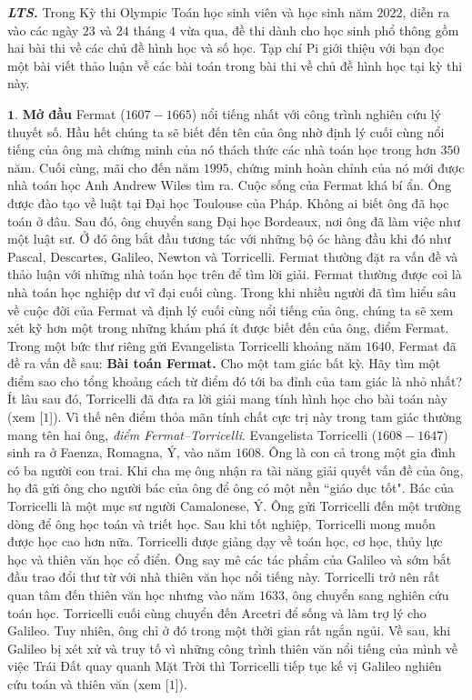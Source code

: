 	\textbf{\color{cackithi}\emph{LTS.}} Trong Kỳ thi Olympic Toán học sinh viên và học sinh năm $2022$, diễn ra vào các ngày $23$ và $24$ tháng $4$ vừa qua, đề thi dành cho học sinh phổ thông gồm hai bài thi về các chủ đề hình học và số học. Tạp chí Pi giới thiệu với bạn đọc một bài viết thảo luận về các bài toán trong bài thi về chủ đề hình học tại kỳ thi này.   
\begin{multicols}{2}
	$\pmb{1.}$ \textbf{\color{cackithi}Mở đầu}
	\vskip 0.1cm
	Fermat ($1607-1665$) nổi tiếng nhất với công trình nghiên cứu lý thuyết số. Hầu hết chúng ta sẽ biết đến tên của ông nhờ định lý cuối cùng nổi tiếng của ông mà chứng minh của nó thách thức các nhà toán học trong hơn $350$ năm. Cuối cùng, mãi cho đến năm $1995$, chứng minh hoàn chỉnh của nó mới được nhà toán học Anh Andrew Wiles tìm ra. Cuộc sống của Fermat khá bí ẩn. Ông được đào tạo về luật tại Đại học Toulouse của Pháp. Không ai biết ông đã học toán ở đâu. Sau đó, ông chuyển sang Đại học Bordeaux, nơi ông đã làm việc như một luật sư. Ở đó ông bắt đầu tương tác với những bộ óc hàng đầu khi đó như Pascal, Descartes, Galileo, Newton và Torricelli. Fermat thường đặt ra vấn đề và thảo luận với những nhà toán học trên để tìm lời giải. Fermat thường được coi là nhà toán học nghiệp dư vĩ đại cuối cùng. Trong khi nhiều người đã tìm hiểu sâu về cuộc đời của Fermat và định lý cuối cùng nổi tiếng của ông, chúng ta sẽ xem xét kỹ hơn một trong những khám phá ít được biết đến của ông, điểm Fermat. Trong một bức thư riêng gửi Evangelista Torricelli khoảng năm $1640$, Fermat đã đề ra vấn đề sau: 
	\vskip 0.1cm
	{\bf\color{cackithi}Bài toán Fermat.} Cho một tam giác bất kỳ. Hãy tìm một điểm sao cho tổng khoảng cách từ điểm đó tới ba đỉnh của tam giác là nhỏ nhất? 
	\vskip 0.1cm
	Ít lâu sau đó, Torricelli đã đưa ra lời giải mang tính hình học cho bài toán này (xem [$1$]). Vì thế nên điểm thỏa mãn tính chất cực trị này trong tam giác thường mang tên hai ông, \emph{điểm Fermat--Torricelli}.
	\vskip 0.1cm
	Evangelista Torricelli ($1608-1647$) sinh ra ở Faenza, Romagna, Ý, vào năm $1608$. Ông là con cả trong một gia đình có ba người con trai. Khi cha mẹ ông nhận ra tài năng giải quyết vấn đề của ông, họ đã gửi ông cho người bác của ông để ông có một nền ``giáo dục tốt". Bác của Torricelli là một mục sư người Camalonese, Ý. Ông gửi Torricelli đến một trường dòng để ông học toán và triết học. Sau khi tốt nghiệp, Torricelli mong muốn được học cao hơn nữa. Torricelli được giảng dạy về toán học, cơ học, thủy lực học và thiên văn học cổ điển. Ông say mê các tác phẩm của Galileo và sớm bắt đầu trao đổi thư từ với nhà thiên văn học nổi tiếng này. Torricelli trở nên rất quan tâm đến thiên văn học nhưng vào năm $1633$, ông chuyển sang nghiên cứu toán học. Torricelli cuối cùng chuyển đến Arcetri để sống và làm trợ lý cho Galileo. Tuy nhiên, ông chỉ ở đó trong một thời gian rất ngắn ngủi. Về sau, khi Galileo bị xét xử và truy tố vì những công trình thiên văn nổi tiếng của mình về việc Trái Đất quay quanh Mặt Trời thì Torricelli tiếp tục kế vị Galileo nghiên cứu toán và thiên \linebreak văn (xem [$1$]).

\end{multicols}
